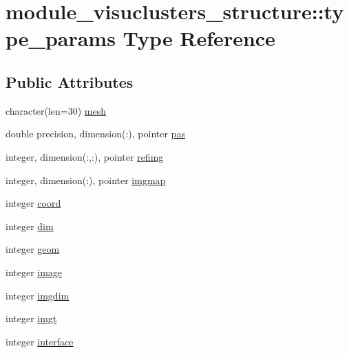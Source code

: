\hypertarget{structmodule__visuclusters__structure_1_1type__params}{}\section{module\+\_\+visuclusters\+\_\+structure\+:\+:type\+\_\+params Type Reference}
\label{structmodule__visuclusters__structure_1_1type__params}
\subsection*{Public Attributes}
\begin{DoxyCompactItemize}
\item 
character(len=30) \hyperlink{structmodule__visuclusters__structure_1_1type__params_a2217cf949d7c0691fa70b7a654d9db20}{mesh}
\item 
double precision, dimension(\+:), pointer \hyperlink{structmodule__visuclusters__structure_1_1type__params_a400a0deb3ac4ced38bae01ccbe6148f0}{pas}
\item 
integer, dimension(\+:,\+:), pointer \hyperlink{structmodule__visuclusters__structure_1_1type__params_aac8aed43c2a6498a0cda0fa76a29615a}{refimg}
\item 
integer, dimension(\+:), pointer \hyperlink{structmodule__visuclusters__structure_1_1type__params_ab1cdbb95c62b0edbbb81025b93353421}{imgmap}
\item 
integer \hyperlink{structmodule__visuclusters__structure_1_1type__params_a34c16c92c7d1386a2044ce3600ce1c49}{coord}
\item 
integer \hyperlink{structmodule__visuclusters__structure_1_1type__params_a3362eae2ef386fcab58bc168e673b227}{dim}
\item 
integer \hyperlink{structmodule__visuclusters__structure_1_1type__params_a893bedbfe22fca04b088bd7f001ed963}{geom}
\item 
integer \hyperlink{structmodule__visuclusters__structure_1_1type__params_af36709484754bb4577400fb4bcf44ab7}{image}
\item 
integer \hyperlink{structmodule__visuclusters__structure_1_1type__params_abc632497fd004d3dc7d8f0428e532587}{imgdim}
\item 
integer \hyperlink{structmodule__visuclusters__structure_1_1type__params_a12024c5bfa94e5fad4d0110fa603d090}{imgt}
\item 
integer \hyperlink{structmodule__visuclusters__structure_1_1type__params_ae57b6a715225b9e6c0a22a22580b8905}{interface}

\end{DoxyCompactItemize}
